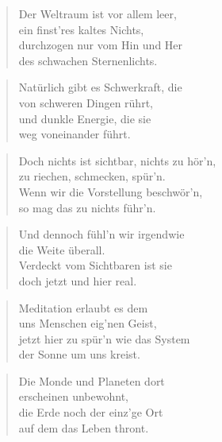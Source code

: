 \documentclass[10pt,a4paper]{article}
\begin{document}
\begin{multicols}{2}
\begin{verse}
Der Weltraum ist vor allem leer, \\
ein finst’res kaltes Nichts, \\
durchzogen nur vom Hin und Her \\
des schwachen Sternenlichts. \\
\end{verse}

\begin{verse}
Natürlich gibt es Schwerkraft, die \\
von schweren Dingen rührt, \\
und dunkle Energie, die sie \\
weg voneinander führt. \\
\end{verse}

\begin{verse}
Doch nichts ist sichtbar, nichts zu hör’n, \\
zu riechen, schmecken, spür’n. \\
Wenn wir die Vorstellung beschwör’n, \\
so mag das zu nichts führ’n. \\
\end{verse}

\begin{verse}
Und dennoch fühl’n wir irgendwie \\
die Weite überall. \\
Verdeckt vom Sichtbaren ist sie \\
doch jetzt und hier real. \\
\end{verse}

\begin{verse}
Meditation erlaubt es dem \\
uns Menschen eig’nen Geist, \\
jetzt hier zu spür’n wie das System \\
der Sonne um uns kreist. \\
\end{verse}

\begin{verse}
Die Monde und Planeten dort \\
erscheinen unbewohnt, \\
die Erde noch der einz’ge Ort \\
auf dem das Leben thront. \\
\end{verse}


\end{multicols}
\end{document}
